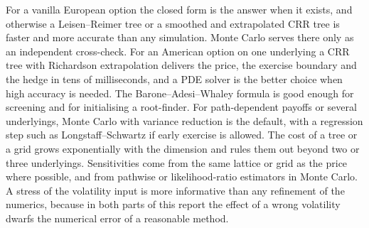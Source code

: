 For a vanilla European option the closed form is the answer when it exists, and otherwise a Leisen--Reimer tree or a smoothed and extrapolated CRR tree is faster and more accurate than any simulation.
Monte Carlo serves there only as an independent cross-check.
For an American option on one underlying a CRR tree with Richardson extrapolation delivers the price, the exercise boundary and the hedge in tens of milliseconds, and a PDE solver is the better choice when high accuracy is needed.
The Barone--Adesi--Whaley formula is good enough for screening and for initialising a root-finder.
For path-dependent payoffs or several underlyings, Monte Carlo with variance reduction is the default, with a regression step such as Longstaff--Schwartz if early exercise is allowed.
The cost of a tree or a grid grows exponentially with the dimension and rules them out beyond two or three underlyings.
Sensitivities come from the same lattice or grid as the price where possible, and from pathwise or likelihood-ratio estimators in Monte Carlo.
A stress of the volatility input is more informative than any refinement of the numerics, because in both parts of this report the effect of a wrong volatility dwarfs the numerical error of a reasonable method.
